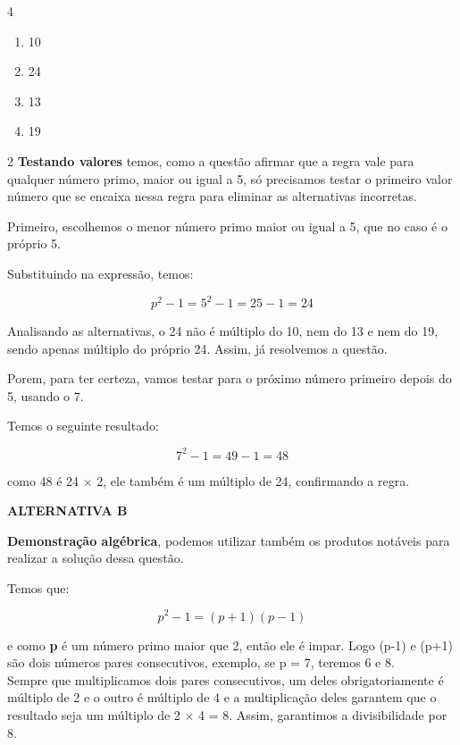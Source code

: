 \begin{multicols}{4}
    \begin{enumerate}[label=\alph*) ]
        \item 10
        \item 24
        \item 13
        \item 19
    \end{enumerate}
\end{multicols}
\begin{solucoes}{2}
    \solucao
    \textbf{Testando valores} temos, como a questão afirmar que a regra vale para qualquer número primo, maior ou igual a 5,  só precisamos testar o primeiro valor número que se encaixa nessa regra para eliminar as alternativas incorretas.

    Primeiro, escolhemos o menor número primo maior ou igual a 5, que no caso é o próprio 5.

    Substituindo na expressão, temos:

    $$p^2-1 = 5^2 - 1 = 25 -1 = 24$$

    Analisando as alternativas, o 24 não é múltiplo do 10, nem do 13 e nem do 19, sendo apenas múltiplo do próprio 24. Assim, já resolvemos a questão.

    Porem, para ter certeza, vamos testar para o próximo número primeiro depois do 5, usando o 7.

    Temos o seguinte resultado:

    $$7^2 - 1 = 49 -1 = 48$$

    como 48 é 24 $\times$ 2, ele também é um múltiplo de 24, confirmando a regra.

    \textbf{ALTERNATIVA B}

    \solucao

    \textbf{Demonstração algébrica}, podemos utilizar também os produtos notáveis para realizar a solução dessa questão.

    Temos que:

    $$p^2 - 1 = (p+1)(p-1)$$

    e como \textbf{p} é um número primo maior que 2, então ele é impar. Logo (p-1) e (p+1) são dois números pares consecutivos, exemplo, se p = 7, teremos 6 e 8.\\

    Sempre que multiplicamos dois pares consecutivos, um deles obrigatoriamente é múltiplo de 2 e o outro é múltiplo de 4 e a multiplicação deles garantem que o resultado seja um múltiplo de 2 $\times$ 4 = 8. Assim, garantimos a divisibilidade por 8.\\


\end{solucoes}
